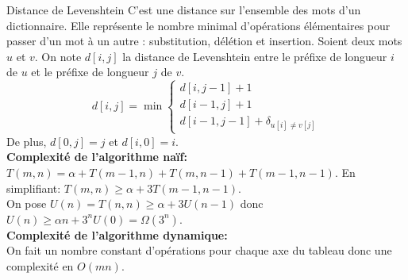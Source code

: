 \documentclass[french, 11pt]{article}
\begin{document}
\begin{ex}{Distance de Levenshtein}{}
    C'est une distance sur l'ensemble des mots d'un dictionnaire. Elle représente le nombre minimal d'opérations élémentaires pour passer d'un mot à un autre : substitution, délétion et insertion.
    Soient deux mots $u$ et $v$. On note $d[i,j]$ la distance de Levenshtein entre le préfixe de longueur $i$ de $u$ et le préfixe de longueur $j$ de $v$.
    \begin{equation*}
        d[i,j] = \min\begin{cases}
            d[i,j-1] + 1\\
            d[i-1,j] + 1\\
            d[i-1,j-1] + \delta_{u[i] \neq v[j]}
        \end{cases}
    \end{equation*}
    De plus, $d[0,j]=j$ et $d[i,0]=i$.\\
    \textbf{Complexité de l'algorithme naïf:}\\
    $T(m,n)=\alpha + T(m-1,n) + T(m,n-1) + T(m-1,n-1)$. En simplifiant: $T(m,n) \geq \alpha + 3T(m-1, n-1)$.\\
    On pose $U(n)=T(n,n)\geq\alpha+3U(n-1)$ donc $U(n)\geq\alpha n + 3^nU(0)=\Omega(3^n)$.\\
    \textbf{Complexité de l'algorithme dynamique:}\\
    On fait un nombre constant d'opérations pour chaque axe du tableau donc une complexité en $O(mn)$.
\end{ex}

\vspace*{-0.7cm}
\end{document}
